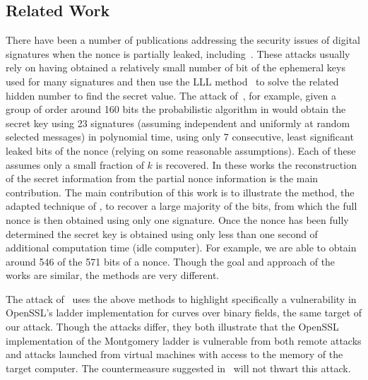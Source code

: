 \documentclass{llncs}
\begin{document}
\subsection{Related Work}\label{sec:related}
There have been a number of publications addressing the security issues of digital signatures when the nonce is partially leaked, including~\cite{Howgrave-GrahamS01,gopalakrishnan07solving,nguyen03insecurity}. These attacks usually rely on having obtained a relatively small number of bit of the ephemeral keys used for many signatures and then use the LLL method~\cite{LLL} to solve the related hidden number to find the secret value. The attack of~\cite{nguyen03insecurity}, for example, given a group of order around 160 bits the probabilistic algorithm in would obtain the secret key using 23 signatures (assuming independent and uniformly at random selected messages) in polynomial time, using only 7 consecutive, least significant leaked bits of the nonce (relying on some reasonable assumptions). Each of these assumes only a small fraction of $k$ is recovered. In these works the reconstruction of the secret information from the partial nonce information is the main contribution. The main contribution of this work is to illustrate the method, the adapted technique of \cite{yarom13flush}, to recover a large majority of the bits, from which the full nonce is then obtained using only one signature. Once the nonce has been fully determined the secret key is obtained using only less than one second of additional computation time (idle computer). 
For example, we are able to obtain around 546 of the 571 bits of a nonce. Though the goal and approach of the works are similar, the methods are very different.

The attack of~\cite{brumley11remote} uses the above methods to highlight specifically a vulnerability in OpenSSL's ladder implementation for curves over binary fields, the same target of our attack. Though the attacks differ, they both illustrate that the OpenSSL implementation of the Montgomery ladder is vulnerable from both remote attacks and attacks launched from virtual machines with access to the memory of the target computer. The countermeasure suggested in~\cite{brumley11remote} will not thwart this attack.

\end{document}
